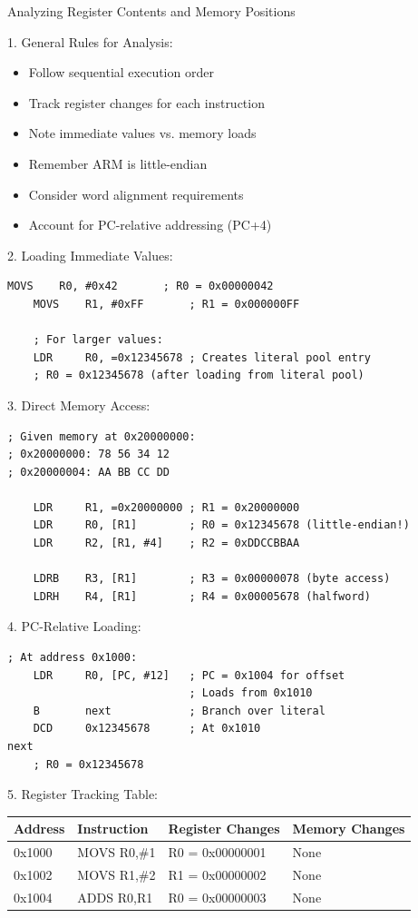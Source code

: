 \begin{KR}{Analyzing Register Contents and Memory Positions}

1. General Rules for Analysis:
\begin{itemize}
  \item Follow sequential execution order
  \item Track register changes for each instruction
  \item Note immediate values vs. memory loads
  \item Remember ARM is little-endian
  \item Consider word alignment requirements
  \item Account for PC-relative addressing (PC+4)
\end{itemize}

2. Loading Immediate Values:
\begin{lstlisting}[language=armasm, style=basesmol]
    MOVS    R0, #0x42       ; R0 = 0x00000042
    MOVS    R1, #0xFF       ; R1 = 0x000000FF
    
    ; For larger values:
    LDR     R0, =0x12345678 ; Creates literal pool entry
    ; R0 = 0x12345678 (after loading from literal pool)
\end{lstlisting}

3. Direct Memory Access:
\begin{lstlisting}[language=armasm, style=basesmol]
; Given memory at 0x20000000:
; 0x20000000: 78 56 34 12
; 0x20000004: AA BB CC DD

    LDR     R1, =0x20000000 ; R1 = 0x20000000
    LDR     R0, [R1]        ; R0 = 0x12345678 (little-endian!)
    LDR     R2, [R1, #4]    ; R2 = 0xDDCCBBAA
    
    LDRB    R3, [R1]        ; R3 = 0x00000078 (byte access)
    LDRH    R4, [R1]        ; R4 = 0x00005678 (halfword)
\end{lstlisting}

4. PC-Relative Loading:
\begin{lstlisting}[language=armasm, style=basesmol]
    ; At address 0x1000:
    LDR     R0, [PC, #12]   ; PC = 0x1004 for offset
                            ; Loads from 0x1010
    B       next            ; Branch over literal
    DCD     0x12345678      ; At 0x1010
next
    ; R0 = 0x12345678
\end{lstlisting}

5. Register Tracking Table:

\begin{tabular}{|l|l|l|l|}
\hline
Address & Instruction & Register Changes & Memory Changes \\
\hline
0x1000 & MOVS R0,\#1 & R0 = 0x00000001 & None \\
0x1002 & MOVS R1,\#2 & R1 = 0x00000002 & None \\
0x1004 & ADDS R0,R1  & R0 = 0x00000003 & None \\
\hline
\end{tabular}

\end{KR}

